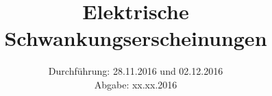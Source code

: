 
\usepackage{showframe}

\subject{Versuch 57}
\title{Elektrische Schwankungserscheinungen}
\date{Durchführung: 28.11.2016 und 02.12.2016 \\
      Abgabe: xx.xx.2016}



\maketitle
\newpage







\printbibliography


